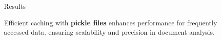 \documentclass[final]{beamer}
\newlength{\sepwidth}
\newlength{\colwidth}
\newcommand{\separatorcolumn}{\begin{column}{\sepwidth}\end{column}}
\begin{document}
\begin{frame}[t]
\begin{columns}[t]
\begin{column}{\colwidth}
\begin{block}{Results}
				
				
				
				
				
				Efficient caching with \textbf{pickle files} enhances performance for frequently accessed data, ensuring scalability and precision in document analysis.
			\end{block}

			\vspace{-1.45em}

		\end{column}

		\separatorcolumn
	\end{columns}
\end{frame}
\end{document}
